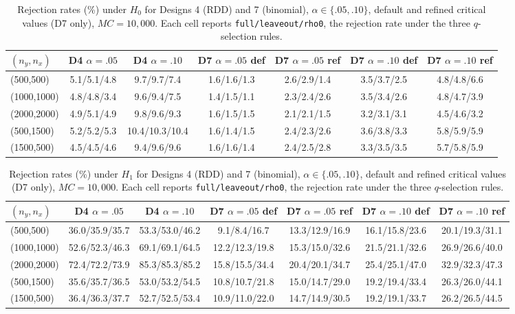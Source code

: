 \documentclass[11pt]{article}
\numberwithin{equation}{section}
\begin{document}
\begin{table}[h!]\footnotesize
\begin{center}
\begin{tabular}{lcccccc}
\hline
$(n_y,n_x)$ & D4 $\alpha{=}.05$ & D4 $\alpha{=}.10$ & D7 $\alpha{=}.05$ def & D7 $\alpha{=}.05$ ref & D7 $\alpha{=}.10$ def & D7 $\alpha{=}.10$ ref \\
\hline
(500,500) & 5.1/5.1/4.8 & 9.7/9.7/7.4 & 1.6/1.6/1.3 & 2.6/2.9/1.4 & 3.5/3.7/2.5 & 4.8/4.8/6.6 \\
(1000,1000) & 4.8/4.8/3.4 & 9.6/9.4/7.5 & 1.4/1.5/1.1 & 2.3/2.4/2.6 & 3.5/3.4/2.6 & 4.8/4.7/3.9 \\
(2000,2000) & 4.9/5.1/4.9 & 9.8/9.6/9.3 & 1.6/1.5/1.5 & 2.1/2.1/1.5 & 3.2/3.1/3.1 & 4.5/4.6/3.2 \\
(500,1500) & 5.2/5.2/5.3 & 10.4/10.3/10.4 & 1.6/1.4/1.5 & 2.4/2.3/2.6 & 3.6/3.8/3.3 & 5.8/5.9/5.9 \\
(1500,500) & 4.5/4.5/4.6 & 9.4/9.6/9.6 & 1.6/1.6/1.4 & 2.4/2.5/2.8 & 3.3/3.5/3.5 & 5.7/5.8/5.9 \\
\hline
\end{tabular}
\caption{\footnotesize Rejection rates (\%) under $H_0$ for Designs 4 (RDD) and 7 (binomial), $\alpha \in \{.05,.10\}$, default and refined critical values (D7 only), $MC=10{,}000$. Each cell reports \texttt{full/leaveout/rho0}, the rejection rate under the three $q$-selection rules.}
\label{tab:extended-size}
\end{center}
\end{table}

\begin{table}[h!]\footnotesize
\begin{center}
\begin{tabular}{lcccccc}
\hline
$(n_y,n_x)$ & D4 $\alpha{=}.05$ & D4 $\alpha{=}.10$ & D7 $\alpha{=}.05$ def & D7 $\alpha{=}.05$ ref & D7 $\alpha{=}.10$ def & D7 $\alpha{=}.10$ ref \\
\hline
(500,500) & 36.0/35.9/35.7 & 53.3/53.0/46.2 & 9.1/8.4/16.7 & 13.3/12.9/16.9 & 16.1/15.8/23.6 & 20.1/19.3/31.1 \\
(1000,1000) & 52.6/52.3/46.3 & 69.1/69.1/64.5 & 12.2/12.3/19.8 & 15.3/15.0/32.6 & 21.5/21.1/32.6 & 26.9/26.6/40.0 \\
(2000,2000) & 72.4/72.2/73.9 & 85.3/85.3/85.2 & 15.8/15.5/34.4 & 20.4/20.1/34.7 & 25.4/25.1/47.0 & 32.9/32.3/47.3 \\
(500,1500) & 35.6/35.7/36.5 & 53.0/53.2/54.5 & 10.8/10.7/21.8 & 15.0/14.7/29.0 & 19.2/19.4/33.4 & 26.3/26.0/44.1 \\
(1500,500) & 36.4/36.3/37.7 & 52.7/52.5/53.4 & 10.9/11.0/22.0 & 14.7/14.9/30.5 & 19.2/19.1/33.7 & 26.2/26.5/44.5 \\
\hline
\end{tabular}
\caption{\footnotesize Rejection rates (\%) under $H_1$ for Designs 4 (RDD) and 7 (binomial), $\alpha \in \{.05,.10\}$, default and refined critical values (D7 only), $MC=10{,}000$. Each cell reports \texttt{full/leaveout/rho0}, the rejection rate under the three $q$-selection rules.}
\label{tab:extended-power}
\end{center}
\end{table}
\end{document}
